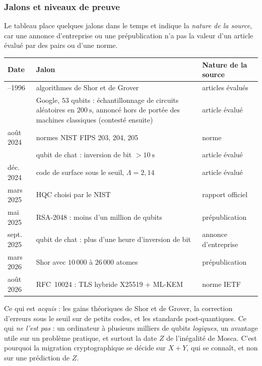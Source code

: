 \subsubsection{Jalons et niveaux de preuve}

Le tableau place quelques jalons dans le temps et indique la \emph{nature de la source}, car une annonce d'entreprise ou une
prépublication n'a pas la valeur d'un article évalué par des pairs ou d'une norme.

\begin{center}
\renewcommand{\arraystretch}{1.2}
\small
\begin{tabular}{@{}>{\raggedright\arraybackslash}p{1.9cm}>{\raggedright\arraybackslash}p{8.8cm}>{\raggedright\arraybackslash}p{3.3cm}@{}}
\toprule
\textbf{Date} & \textbf{Jalon} & \textbf{Nature de la source}\\
\midrule
1994--1996 & algorithmes de Shor et de Grover \parencite{shor1997} & articles évalués\\
2019 & Google, $53$ qubits : échantillonnage de circuits aléatoires en $200\ \mathrm{s}$, annoncé hors de portée des machines classiques \parencite{arute2019} (contesté ensuite) & article évalué\\
août 2024 & normes NIST FIPS 203, 204, 205 \parencite{fips203} & norme\\
2024 & qubit de chat : inversion de bit $>10\ \mathrm{s}$ \parencite{reglade2024} & article évalué\\
déc. 2024 & code de surface sous le seuil, $\Lambda=2{,}14$ \parencite{acharya2025} & article évalué\\
mars 2025 & HQC choisi par le NIST \parencite{nist2025hqc} & rapport officiel\\
mai 2025 & RSA-2048 : moins d'un million de qubits \parencite{gidney2025} & prépublication\\
sept. 2025 & qubit de chat : plus d'une heure d'inversion de bit \parencite{aliceandbob2025} & annonce d'entreprise\\
mars 2026 & Shor avec $10\,000$ à $26\,000$ atomes \parencite{cain2026} & prépublication\\
août 2026 & RFC~10024 : TLS hybride X25519 + ML-KEM \parencite{rfc10024} & norme IETF\\
\bottomrule
\end{tabular}
\end{center}

Ce qui est \emph{acquis} : les gains théoriques de Shor et de Grover, la correction d'erreurs sous le seuil sur de petits codes,
et les standards post-quantiques. Ce qui \emph{ne l'est pas} : un ordinateur à plusieurs milliers de qubits \emph{logiques},
un avantage utile sur un problème pratique, et surtout la date $Z$ de l'inégalité de Mosca. C'est pourquoi la migration cryptographique se
décide sur $X+Y$, qui se connaît, et non sur une prédiction de $Z$.

